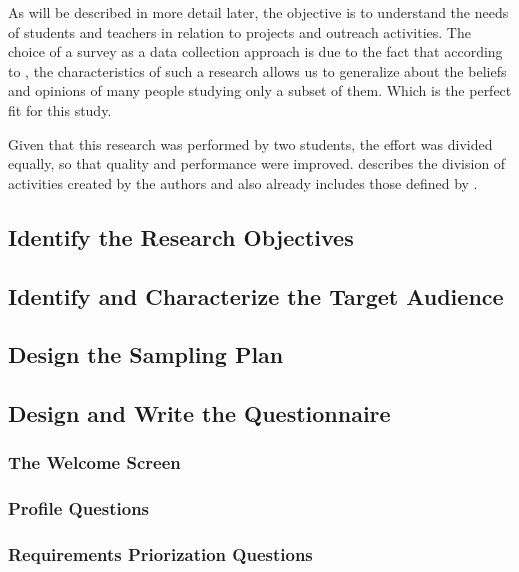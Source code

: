 As will be described in more detail later, the objective is to understand the needs of students and teachers in relation to projects and outreach activities. The choice of a survey as a data collection approach is due to the fact that according to , the characteristics of such a research allows us to generalize about the beliefs and opinions of many people studying only a subset of them. Which is the perfect fit for this study.

Given that this research was performed by two students, the effort was divided equally, so that quality and performance were improved.  describes the division of activities created by the authors and also already includes those defined by .



\subsection{Identify the Research Objectives}\label{sec:survey-objectives}

\subsection{Identify and Characterize the Target Audience}\label{sec:survey-targets}

\subsection{Design the Sampling Plan}\label{sec:survey-sampling}

\subsection{Design and Write the Questionnaire}\label{sec:survey-questionnaire}

\subsubsection{The Welcome Screen}

\subsubsection{Profile Questions}\label{survey:profile-questions}

\subsubsection{Requirements Priorization Questions}

